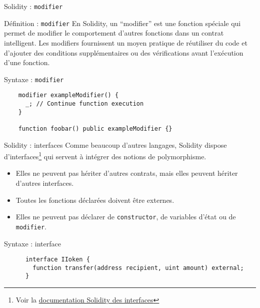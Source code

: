 \begin{frame}[fragile]{Solidity : \texttt{modifier}}
  \begin{block}{Définition : \texttt{modifier}}
    En Solidity, un \enquote{modifier} est une fonction spéciale qui permet de modifier le comportement d'autres fonctions dans un contrat intelligent.
    Les modifiers fournissent un moyen pratique de réutiliser du code et d'ajouter des conditions supplémentaires ou des vérifications avant l'exécution d'une fonction.
  \end{block}


  \begin{block}{Syntaxe : \texttt{modifier}}
    \begin{verbatim}
    modifier exampleModifier() {
      _; // Continue function execution
    }

    function foobar() public exampleModifier {}
  \end{verbatim}
  \end{block}
\end{frame}

\begin{frame}[fragile]{Solidity : interfaces}
  Comme beaucoup d'autres langages, Solidity dispose d'interfaces\footnote{Voir la \href{https://docs.soliditylang.org/fr/stable/contracts.html\#interfaces}{documentation Solidity des interfaces}} qui servent à intégrer des notions de polymorphisme.

  \begin{itemize}
    \item Elles ne peuvent pas hériter d'autres contrats, mais elles peuvent hériter d'autres interfaces.
    \item Toutes les fonctions déclarées doivent être externes.
    \item Elles ne peuvent pas déclarer de \texttt{constructor}, de variables d'état ou de \texttt{modifier}.
  \end{itemize}

  \begin{block}{Syntaxe : interface}
    \begin{verbatim}
      interface IIoken {
        function transfer(address recipient, uint amount) external;
      }
    \end{verbatim}
  \end{block}
\end{frame}

